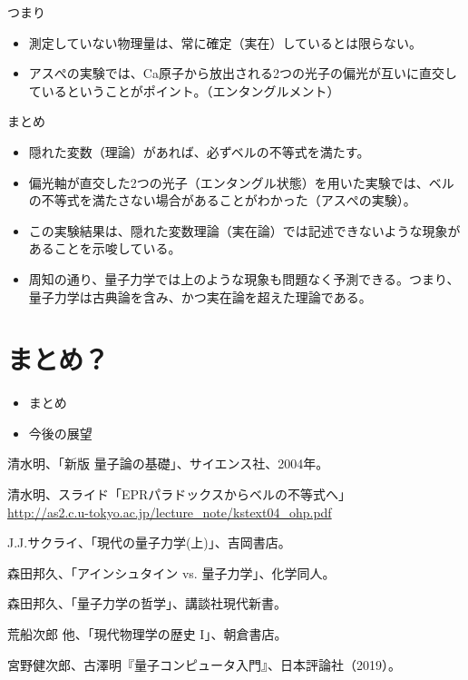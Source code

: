 \documentclass[10pt,b5paper,papersize,dvipdfmx]{jsbook}
\begin{document}
つまり

\begin{itemize}
  \item 測定していない物理量は、常に確定（実在）しているとは限らない。
  \item アスぺの実験では、Ca原子から放出される2つの光子の偏光が互いに直交しているということがポイント。（エンタングルメント）
\end{itemize}

まとめ

\begin{itemize}
  \item 隠れた変数（理論）があれば、必ずベルの不等式を満たす。
  \item 偏光軸が直交した2つの光子（エンタングル状態）を用いた実験では、ベルの不等式を満たさない場合があることがわかった（アスぺの実験）。
  \item この実験結果は、隠れた変数理論（実在論）では記述できないような現象があることを示唆している。
  \item 周知の通り、量子力学では上のような現象も問題なく予測できる。つまり、量子力学は古典論を含み、かつ実在論を超えた理論である。
\end{itemize}

\fi
\section{まとめ？}

\begin{itemize}
  \item まとめ
  \item 今後の展望
\end{itemize}




\begin{thebibliography}{99}
  \item 清水明、「新版 量子論の基礎」、サイエンス社、2004年。
  \item 清水明、スライド「EPRパラドックスからベルの不等式へ」\\
  \url{http://as2.c.u-tokyo.ac.jp/lecture_note/kstext04_ohp.pdf}
  \item J.J.サクライ、「現代の量子力学(上)」、吉岡書店。
  \item 森田邦久、「アインシュタイン vs. 量子力学」、化学同人。
  \item 森田邦久、「量子力学の哲学」、講談社現代新書。
  \item 荒船次郎 他、「現代物理学の歴史 I」、朝倉書店。
  \item 宮野健次郎、古澤明『量子コンピュータ入門』、日本評論社（2019）。
\end{thebibliography}
\end{document}
